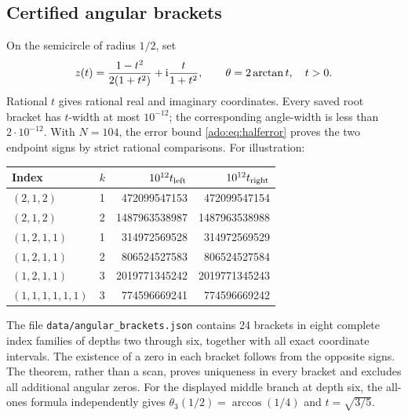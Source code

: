 \subsection{Certified angular brackets}
On the semicircle of radius $1/2$, set
\begin{equation}\label{ado:eq:rationalcircle}
 z(t)=\frac{1-t^2}{2(1+t^2)}+\mathrm{i}\frac{t}{1+t^2},
 \qquad \theta=2\arctan t,\quad t>0.
\end{equation}
Rational $t$ gives rational real and imaginary coordinates. Every saved
root bracket has $t$-width at most $10^{-12}$; the corresponding
angle-width is less than $2\cdot10^{-12}$. With $N=104$, the
error bound \eqref{ado:eq:halferror} proves the two endpoint signs by
strict rational comparisons. For illustration:
\begin{center}\small
\begin{tabular}{@{}lcrr@{}}
\toprule
Index & $k$ & $10^{12}t_{\rm left}$ & $10^{12}t_{\rm right}$\\
\midrule
$(2,1,2)$ & 1 & 472099547153 & 472099547154\\
$(2,1,2)$ & 2 & 1487963538987 & 1487963538988\\
$(1,2,1,1)$ & 1 & 314972569528 & 314972569529\\
$(1,2,1,1)$ & 2 & 806524527583 & 806524527584\\
$(1,2,1,1)$ & 3 & 2019771345242 & 2019771345243\\
$(1,1,1,1,1,1)$ & 3 & 774596669241 & 774596669242\\
\bottomrule
\end{tabular}
\end{center}
The file \texttt{data/angular\_brackets.json} contains 24 brackets in
eight complete index families of depths two through six, together with
all exact coordinate intervals. The existence of a zero in each bracket
follows from the opposite signs. The theorem, rather than a scan,
proves uniqueness in every bracket and excludes all additional angular
zeros. For the displayed middle branch at depth six, the all-ones
formula independently gives
$\theta_3(1/2)=\arccos(1/4)$ and $t=\sqrt{3/5}$.

